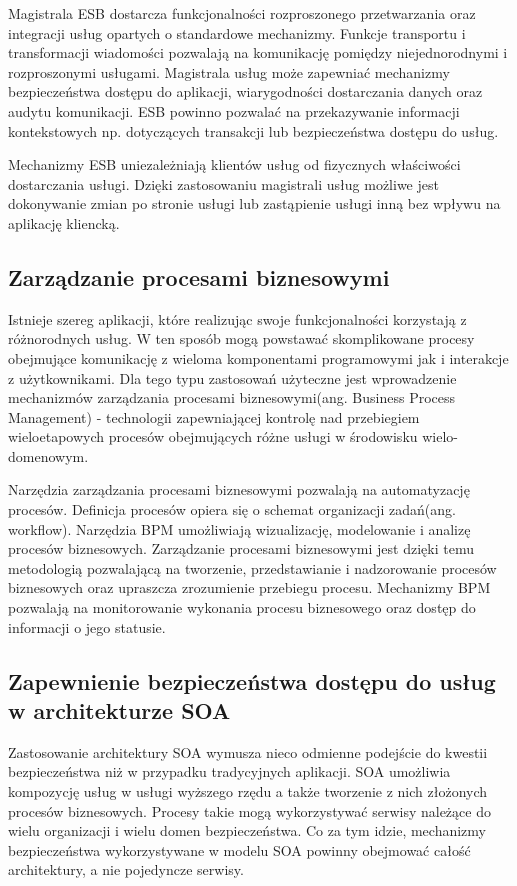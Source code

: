 		Magistrala ESB dostarcza funkcjonalności rozproszonego przetwarzania oraz integracji usług opartych o standardowe mechanizmy. Funkcje transportu i transformacji wiadomości pozwalają na komunikację pomiędzy niejednorodnymi i rozproszonymi usługami. Magistrala usług może zapewniać mechanizmy bezpieczeństwa dostępu do aplikacji, wiarygodności dostarczania danych oraz audytu komunikacji. ESB powinno pozwalać na przekazywanie informacji kontekstowych np. dotyczących transakcji lub bezpieczeństwa dostępu do usług.

		Mechanizmy ESB uniezależniają klientów usług od fizycznych właściwości dostarczania usługi. Dzięki zastosowaniu magistrali usług możliwe jest dokonywanie zmian po stronie usługi lub zastąpienie usługi inną bez wpływu na aplikację kliencką. 

	\subsection{Zarządzanie procesami biznesowymi} 

		Istnieje szereg aplikacji, które realizując swoje funkcjonalności korzystają z różnorodnych usług. W ten sposób mogą powstawać skomplikowane procesy obejmujące komunikację z wieloma komponentami programowymi jak i interakcje z użytkownikami. Dla tego typu zastosowań użyteczne jest wprowadzenie mechanizmów zarządzania procesami biznesowymi(ang. Business Process Management) - technologii zapewniającej kontrolę nad przebiegiem wieloetapowych procesów obejmujących różne usługi w środowisku wielo-domenowym.

		Narzędzia zarządzania procesami biznesowymi pozwalają na automatyzację procesów. Definicja procesów opiera się o schemat organizacji zadań(ang. workflow). Narzędzia BPM umożliwiają wizualizację, modelowanie i analizę procesów biznesowych. Zarządzanie procesami biznesowymi jest dzięki temu metodologią pozwalającą na tworzenie, przedstawianie i nadzorowanie procesów biznesowych oraz upraszcza zrozumienie przebiegu procesu. Mechanizmy BPM pozwalają na monitorowanie wykonania procesu biznesowego oraz dostęp do informacji o jego statusie. 

	\subsection{Zapewnienie bezpieczeństwa dostępu do usług w architekturze SOA}

		Zastosowanie architektury SOA wymusza nieco odmienne podejście do kwestii bezpieczeństwa niż w przypadku tradycyjnych aplikacji. SOA umożliwia kompozycję usług w usługi wyższego rzędu a także tworzenie z nich złożonych procesów biznesowych. Procesy takie mogą wykorzystywać serwisy należące do wielu organizacji i wielu domen bezpieczeństwa. Co za tym idzie, mechanizmy bezpieczeństwa wykorzystywane w modelu SOA powinny obejmować całość architektury, a nie pojedyncze serwisy.\cite{kanneganti2008soa}
		
